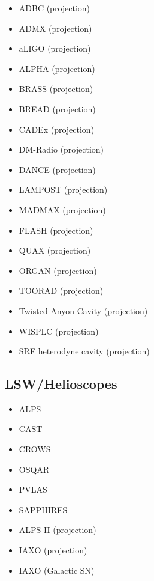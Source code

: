 \documentclass[10pt,twocolumn]{extarticle}
\begin{document}
\begin{mdframed}[everyline=true]
\begin{itemize}
        \item ADBC (projection)~\cite{Liu:2018icu} 
        \item ADMX (projection)~\cite{Stern:2016bbw}
              \item aLIGO (projection)~\cite{Nagano:2019rbw} 
           \item ALPHA (projection)~\cite{Lawson:2019brd,Millar:2022peq} 
           \item BRASS (projection)~\cite{BRASS}
           \item BREAD (projection)~\cite{Liu:2021pei}
           \item CADEx (projection)~\cite{Aja:2022csb}
    \item DM-Radio (projection)~\cite{DMRadio,DMRadio:2022pkf}
     \item DANCE (projection)~\cite{Michimura:2019qxr} 
           \item LAMPOST (projection)~\cite{Baryakhtar:2018doz} 
      \item MADMAX (projection)~\cite{Beurthey:2020yuq} 
           \item FLASH (projection)~\cite{Alesini:2017ifp,FLASH} 
           \item QUAX (projection)~\cite{QUAX} 
                 \item ORGAN (projection)~\cite{McAllister:2017lkb} 
                       \item TOORAD (projection)~\cite{Schutte-Engel:2021bqm} 
                       \item Twisted Anyon Cavity (projection)~\cite{Bourhill:2022alm}
                       \item WISPLC (projection)~\cite{Zhang:2021bpa} 
                       \item SRF heterodyne cavity (projection)~\cite{Berlin:2020vrk}

\end{itemize}
\vspace{-2.5em}
\subsection*{LSW/Helioscopes}\vspace{-0.5em}
\begin{itemize}\setlength\itemsep{-0.5em}
    \item ALPS~\cite{Ehret:2010mh}
    \item CAST~\cite{CAST:2007jps,CAST:2017uph}
    \item CROWS~\cite{Betz:2013dza}
    \item OSQAR~\cite{OSQAR:2015qdv}
    \item PVLAS~\cite{DellaValle:2015xxa}
    \item SAPPHIRES~\cite{SAPPHIRES:2021vkz,SAPPHIRES:2022bqg}
    \item ALPS-II (projection)~\cite{Ortiz:2020tgs}
    \item IAXO (projection)~\cite{Shilon:2013xma}
    \item IAXO (Galactic SN)~\cite{Ge:2020zww}
\end{itemize}


\end{mdframed}
\end{document}
